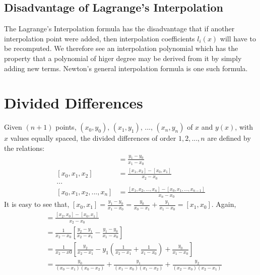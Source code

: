 \documentclass[aima203_lecturenotes_ku.tex]{subfiles}
\begin{document}
\subsection{Disadvantage of Lagrange's Interpolation}
The Lagrange's Interpolation formula has the disadvantage that if another interpolation point were added, then interpolation coefficients $l_i(x)$ will have to be recomputed. We therefore see an interpolation polynomial which has the property that a polynomial of higer degree may be derived from it by simply adding new terms. Newton's general interpolation formula is one such formula.

\section{Divided Differences}
Given $(n+1)$ points, $(x_0,y_0), \, (x_1,y_1), \, ..., \, (x_n,y_n)$ of $x$ and $y(x)$, with $x$ values equally spaced, the divided differences of order $1,2,...,n$ are defined by the relations:
\begin{align*}
  [x_0,x_1] &= \frac{y_1 - y_0}{x_1 - x_0} \\[1mm]
  [x_0,x_1,x_2] &= \frac{[x_1, x_2]-[x_0,x_1]}{x_2 - x_0} \\[1mm]
  ... \\
  [x_0,x_1,x_2,...,x_n] &= \frac{[x_1, x_2,...,x_n]-[x_0,x_1,...,x_{n-1}]}{x_n - x_0}
\end{align*}
It is easy to see that, $\displaystyle [x_0,x_1] = \frac{y_1 - y_0}{x_1 - x_0} = \frac{y_0}{x_0 - x_1} + \frac{y_1}{x_1 - x_0} = [x_1,x_0]$.
Again,
\begin{align*}
  [x_0,x_1,x_2] &= \frac{[x_2, x_0]-[x_0,x_1]}{x_2 - x_0} \\[1mm]
                &= \frac{1}{x_2 - x_0} \left [ \frac{y_2- y_1}{x_2 - x_1} - \frac{y_1 - y_0}{x_1 - x_0} \right ] \\[1mm]
                  &= \frac{1}{x_2 - x0} \left [ \frac{y_2}{x_2 - x_1} -y_1 \left ( \frac{1}{x_2-x_1} + \frac{1}{x_1 - x_0} \right ) + \frac{y_0}{x_1 - x_0} \right ] \\[1mm]
  &= \frac{y_0}{(x_0-x_1)(x_0-x_2)} + \frac{y_1}{(x_1-x_0)(x_1-x_2)} + \frac{y_2}{(x_2-x_0)(x_2-x_1)}
\end{align*}
\end{document}
